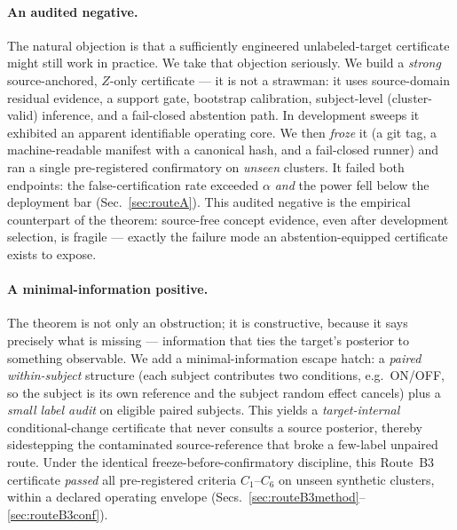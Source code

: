 \paragraph{An audited negative.}
The natural objection is that a sufficiently engineered unlabeled-target certificate might still work in
practice. We take that objection seriously. We build a \emph{strong} source-anchored, $Z$-only certificate
--- it is not a strawman: it uses source-domain residual evidence, a support gate, bootstrap calibration,
subject-level (cluster-valid) inference, and a fail-closed abstention path. In development sweeps it
exhibited an apparent identifiable operating core. We then \emph{froze} it (a git tag, a machine-readable
manifest with a canonical hash, and a fail-closed runner) and ran a single pre-registered confirmatory on
\emph{unseen} clusters. It failed both endpoints: the false-certification rate exceeded $\alpha$ \emph{and}
the power fell below the deployment bar (Sec.~\ref{sec:routeA}). This audited negative is the empirical
counterpart of the theorem: source-free concept evidence, even after development selection, is fragile ---
exactly the failure mode an abstention-equipped certificate exists to expose. 

\paragraph{A minimal-information positive.}
The theorem is not only an obstruction; it is constructive, because it says precisely what is missing ---
information that ties the target's posterior to something observable. We add a minimal-information escape hatch:
a \emph{paired within-subject} structure (each subject contributes two conditions, e.g.\ ON/OFF, so the
subject is its own reference and the subject random effect cancels) plus a \emph{small label audit} on
eligible paired subjects. This yields a \emph{target-internal} conditional-change certificate that never
consults a source posterior, thereby sidestepping the contaminated source-reference that broke a
few-label unpaired route. Under the identical freeze-before-confirmatory discipline, this Route~B3
certificate \emph{passed} all pre-registered criteria $C_1$--$C_6$ on unseen synthetic clusters, within a
declared operating envelope (Secs.~\ref{sec:routeB3method}--\ref{sec:routeB3conf}). 

